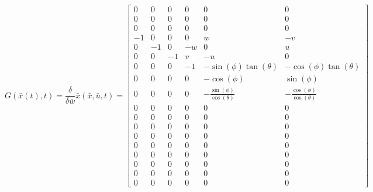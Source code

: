 \begin{equation}
G\left( {\bar x\left( t \right),t} \right) =
\frac{\delta}{\delta \bar w} \dot{\bar x} \left( {\bar x,\bar u,t} \right) = 
\left[\begin{matrix}0 & 0 & 0 & 0 & 0 & 0\\0 & 0 & 0 & 0 & 0 & 0\\0 & 0 & 0 & 0 & 0 & 0\\-1 & 0 & 0 & 0 & w & - v\\0 & -1 & 0 & - w & 0 & u\\0 & 0 & -1 & v & - u & 0\\0 & 0 & 0 & -1 & - \sin{\left (\phi \right )} \tan{\left (\theta \right )} & - \cos{\left (\phi \right )} \tan{\left (\theta \right )}\\0 & 0 & 0 & 0 & - \cos{\left (\phi \right )} & \sin{\left (\phi \right )}\\0 & 0 & 0 & 0 & - \frac{\sin{\left (\phi \right )}}{\cos{\left (\theta \right )}} & - \frac{\cos{\left (\phi \right )}}{\cos{\left (\theta \right )}}\\0 & 0 & 0 & 0 & 0 & 0\\0 & 0 & 0 & 0 & 0 & 0\\0 & 0 & 0 & 0 & 0 & 0\\0 & 0 & 0 & 0 & 0 & 0\\0 & 0 & 0 & 0 & 0 & 0\\0 & 0 & 0 & 0 & 0 & 0\\0 & 0 & 0 & 0 & 0 & 0\\0 & 0 & 0 & 0 & 0 & 0\\0 & 0 & 0 & 0 & 0 & 0\end{matrix}\right]
    \label{eq:iekf_g}
\end{equation}


